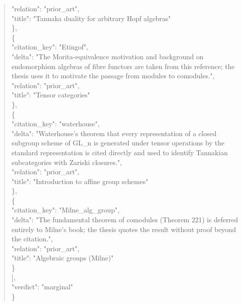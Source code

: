 \documentclass[11pt]{article}
\begin{document}
\begin{quote}
      "relation": "prior\_art",\\
      "title": "Tannaka duality for arbitrary Hopf algebras"\\
    \},\\
    \{\\
      "citation\_key": "Etingof",\\
      "delta": "The Morita-equivalence motivation and background on endomorphism algebras of fibre functors are taken from this reference; the thesis uses it to motivate the passage from modules to comodules.",\\
      "relation": "prior\_art",\\
      "title": "Tensor categories"\\
    \},\\
    \{\\
      "citation\_key": "waterhouse",\\
      "delta": "Waterhouse's theorem that every representation of a closed subgroup scheme of GL\_n is generated under tensor operations by the standard representation is cited directly and used to identify Tannakian subcategories with Zariski closures.",\\
      "relation": "prior\_art",\\
      "title": "Introduction to affine group schemes"\\
    \},\\
    \{\\
      "citation\_key": "Milne\_alg\_group",\\
      "delta": "The fundamental theorem of comodules (Theorem 221) is deferred entirely to Milne's book; the thesis quotes the result without proof beyond the citation.",\\
      "relation": "prior\_art",\\
      "title": "Algebraic groups (Milne)"\\
    \}\\
  ],\\
  "verdict": "marginal"\\
\}\\
\end{quote}
\end{document}
